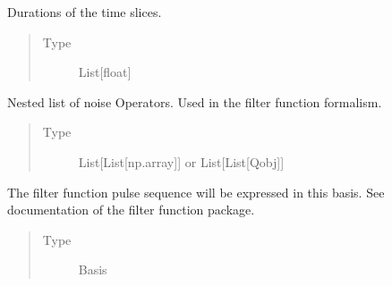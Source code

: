 \documentclass[letterpaper,10pt,english]{sphinxmanual}
\begin{document}
\begin{fulllineitems}
\begin{fulllineitems}
\begin{quote}
\begin{description}
\end{description}\end{quote}

\end{fulllineitems}


\begin{fulllineitems}
\label{\detokenize{qsim:qsim.solver_algorithms.Solver.tau}}
Durations of the time slices.
\begin{quote}\begin{description}
\item[{Type}] \leavevmode
List{[}float{]}

\end{description}\end{quote}

\end{fulllineitems}


\begin{fulllineitems}
\label{\detokenize{qsim:qsim.solver_algorithms.Solver.filter_function_h_n}}
Nested list of noise Operators. Used in the filter function
formalism.
\begin{quote}\begin{description}
\item[{Type}] \leavevmode
List{[}List{[}np.array{]}{]} or List{[}List{[}Qobj{]}{]}

\end{description}\end{quote}

\end{fulllineitems}


\begin{fulllineitems}
\label{\detokenize{qsim:qsim.solver_algorithms.Solver.filter_function_basis}}
The filter function pulse sequence will be expressed in this basis.
See documentation of the filter function package.
\begin{quote}\begin{description}
\item[{Type}] \leavevmode
Basis


\end{description}
\end{quote}
\end{fulllineitems}
\end{fulllineitems}
\end{document}
